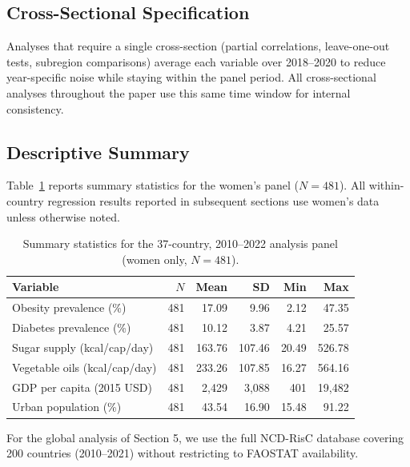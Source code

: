 \subsection{Cross-Sectional Specification}

Analyses that require a single cross-section (partial correlations, leave-one-out tests, subregion comparisons) average each variable over 2018--2020 to reduce year-specific noise while staying within the panel period. All cross-sectional analyses throughout the paper use this same time window for internal consistency.

\subsection{Descriptive Summary}

Table~\ref{tab:descriptives} reports summary statistics for the women's panel ($N = 481$). All within-country regression results reported in subsequent sections use women's data unless otherwise noted.

\begin{table}[htbp]
\centering
\caption{Summary statistics for the 37-country, 2010--2022 analysis panel (women only, $N = 481$).}
\label{tab:descriptives}
\small
\begin{tabular}{lrrrrr}
\toprule
Variable & $N$ & Mean & SD & Min & Max \\
\midrule
Obesity prevalence (\%) & 481 & 17.09 & 9.96 & 2.12 & 47.35 \\
Diabetes prevalence (\%) & 481 & 10.12 & 3.87 & 4.21 & 25.57 \\
Sugar supply (kcal/cap/day) & 481 & 163.76 & 107.46 & 20.49 & 526.78 \\
Vegetable oils (kcal/cap/day) & 481 & 233.26 & 107.85 & 16.27 & 564.16 \\
GDP per capita (2015 USD) & 481 & 2,429 & 3,088 & 401 & 19,482 \\
Urban population (\%) & 481 & 43.54 & 16.90 & 15.48 & 91.22 \\
\bottomrule
\end{tabular}
\end{table}

For the global analysis of Section 5, we use the full NCD-RisC database covering 200 countries (2010--2021) without restricting to FAOSTAT availability.

